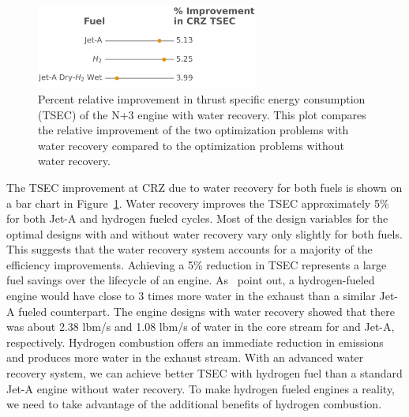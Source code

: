\documentclass[conf]{new-aiaa}
\begin{document}
\begin{figure}[hbt!]
  \centering
  \includegraphics[width=0.65\textwidth]{bar_chart.pdf}
  \caption{Percent relative improvement in thrust specific energy consumption (TSEC) of the N+3 engine with water recovery.
    This plot compares the relative improvement of the two optimization problems with water recovery compared to the optimization problems without water recovery.}
  \label{fig:barchart}
\end{figure}

The TSEC improvement at CRZ due to water recovery for both fuels is shown on a bar chart in Figure~\ref{fig:barchart}.
Water recovery improves the TSEC approximately 5\% for both Jet-A and hydrogen fueled cycles.
Most of the design variables for the optimal designs with and without water recovery vary only slightly for both fuels.
This suggests that the water recovery system accounts for a majority of the efficiency improvements.
Achieving a 5\% reduction in TSEC represents a large fuel savings over the lifecycle of an engine.
As~\citeauthor{Strom2002} point out, a hydrogen-fueled engine would have close to 3 times more water in the exhaust than a similar Jet-A fueled counterpart.
The engine designs with water recovery showed that there was about 2.38 \si{lbm/s} and 1.08 \si{lbm/s} of water in the core stream for  and Jet-A, respectively.
Hydrogen combustion offers an immediate reduction in emissions and produces more water in the exhaust stream.
With an advanced water recovery system, we can achieve better TSEC with hydrogen fuel than a standard Jet-A engine without water recovery.
To make hydrogen fueled engines a reality, we need to take advantage of the additional benefits of hydrogen combustion.
\end{document}
